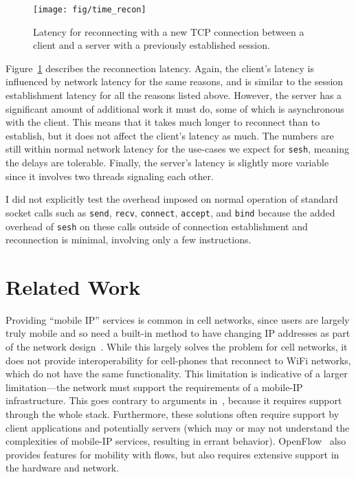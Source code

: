 \documentclass[twocolumn,11pt]{article}
\newcommand{\sesh}{\texttt{sesh}\xspace}
\begin{document}
\begin{figure}[!htb]
	\centering
	\texttt{[image: fig/time\_recon]}
	\caption{Latency for reconnecting with a new TCP connection between a client
	and a server with a previously established session.}
	\label{fig:recon}
\end{figure}

Figure~\ref{fig:recon} describes the reconnection latency. Again, the client's
latency is influenced by network latency for the same reasons, and is similar to
the session establishment latency for all the reasons listed above. However, the
server has a significant amount of additional work it must do, some of which is
asynchronous with the client. This means that it takes much longer to reconnect
than to establish, but it does not affect the client's latency as much. The
numbers are still within normal network latency for the use-cases we expect for
\sesh, meaning the delays are tolerable. Finally, the server's latency is
slightly more variable since it involves two threads signaling each other.

I did not explicitly test the overhead imposed on normal operation of standard
socket calls such as \texttt{send}, \texttt{recv}, \texttt{connect},
\texttt{accept}, and \texttt{bind} because the added overhead of \sesh on these
calls outside of connection establishment and reconnection is minimal, involving
only a few instructions.

\section{Related Work}

Providing ``mobile IP'' services is common in cell networks, since users are
largely truly mobile and so need a built-in method to have changing IP addresses
as part of the network design~\cite{ltemob,mobileip,Kurose}. While this largely
solves the problem for cell networks, it does not provide interoperability for
cell-phones that reconnect to WiFi networks, which do not have the same
functionality. This limitation is indicative of a larger limitation---the
network must support the requirements of a mobile-IP infrastructure. This goes
contrary to arguments in~\cite{Saltzer}, because it requires support through the
whole stack. Furthermore, these solutions often require support by client
applications and potentially servers (which may or may not understand the
complexities of mobile-IP services, resulting in errant behavior).
OpenFlow~\cite{McKeown} also
provides features for mobility with flows, but also requires extensive support
in the hardware and network.
\end{document}
